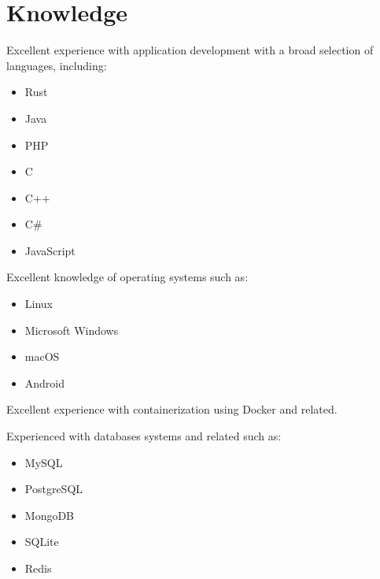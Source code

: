 \documentclass[]{friggeri-cv}
\providecommand{\tightlist}{%
\setlength{\itemsep}{0pt}\setlength{\parskip}{0pt}}
\begin{document}
\newpage{}


\section{Knowledge}

Excellent experience with application development with a broad selection of
languages, including:

\begin{multicols}{3}
\begin{itemize}
  \tightlist{}
  \item Rust
  \item Java
  \item PHP
  \item C
  \item C++
  \item C\#
  \item JavaScript
\end{itemize}
\end{multicols}

Excellent knowledge of operating systems such as:

\begin{multicols}{3}
\begin{itemize}
  \tightlist{}
  \item Linux
  \item Microsoft Windows
  \item macOS
  \item Android
\end{itemize}
\end{multicols}

Excellent experience with containerization using Docker and related.

Experienced with databases systems and related such as:

\begin{multicols}{3}
\begin{itemize}
  \tightlist{}
  \item MySQL
  \item PostgreSQL
  \item MongoDB
  \item SQLite
  \item Redis
\end{itemize}
\end{multicols}
\end{document}
